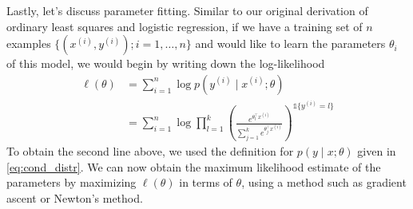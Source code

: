 Lastly, let's discuss parameter fitting. Similar to our original derivation
of ordinary least squares and logistic regression, if we have a training set of
$n$ examples $\{(x^{(i)} ,y^{(i)} );i = 1,\ldots,n\}$ and would like to learn the parameters
$\theta_i$ of this model, we would begin by writing down the log-likelihood
\begin{align}
    \ell(\theta) &= \sum_{i=1}^n \log p(y^{(i)} \mid x^{(i)}; \theta)\\
                 &= \sum_{i=1}^n \log \prod_{l=1}^k \left( \frac{e^{\theta^\top_l x^{(i)}}}{\sum_{j=1}^k e^{\theta^\top_j x^{(i)}}} \right) ^{\mathbb{1}\{y^{(i)} = l\}}
\end{align}
To obtain the second line above, we used the definition for $p(y \mid x;\theta)$ given
in \ref{eq:cond_distr}. We can now obtain the maximum likelihood estimate of
the parameters by maximizing $\ell(\theta)$ in terms of $\theta$, using a method such as
gradient ascent or Newton's method.